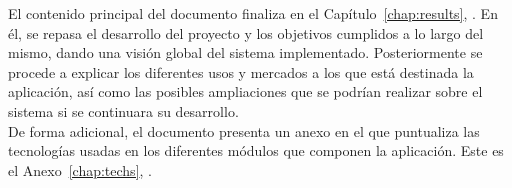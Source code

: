 El contenido principal del documento finaliza en el Capítulo~\ref{chap:results}, \textit{}. En él, se repasa el desarrollo del proyecto y los objetivos cumplidos a lo largo del mismo, dando una visión global del sistema implementado. Posteriormente se procede a explicar los diferentes usos y mercados a los que está destinada la aplicación, así como las posibles ampliaciones que se podrían realizar sobre el sistema si se continuara su desarrollo.\\

De forma adicional, el documento presenta un anexo en el que puntualiza las tecnologías usadas en los diferentes módulos que componen la aplicación. Este es el Anexo~\ref{chap:techs}, \textit{}.



